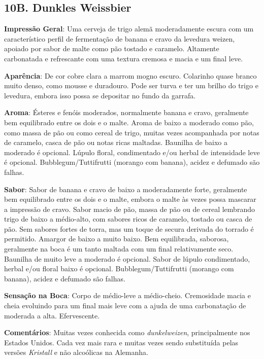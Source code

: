 \subsection*{10B. Dunkles Weissbier}

\textbf{Impressão Geral}: Uma cerveja de trigo alemã moderadamente escura com um característico perfil de fermentação de banana e cravo da levedura weizen, apoiado por sabor de malte como pão tostado e caramelo. Altamente carbonatada e refrescante com uma textura cremosa e macia e um final leve.

\textbf{Aparência}: De cor cobre clara a marrom mogno escuro. Colarinho quase branco muito denso, como mousse e duradouro. Pode ser turva e ter um brilho do trigo e levedura, embora isso possa se depositar no fundo da garrafa.

\textbf{Aroma}: Ésteres e fenóis moderados, normalmente banana e cravo, geralmente bem equilibrado entre os dois e o malte. Aroma de baixo a moderado como pão, como massa de pão ou como cereal de trigo, muitas vezes acompanhada por notas de caramelo, casca de pão ou notas ricas maltadas. Baunilha de baixo a moderado é opcional. Lúpulo floral, condimentado e/ou herbal de intensidade leve é opcional. Bubblegum/Tuttifrutti (morango com banana), acidez e defumado são falhas.

\textbf{Sabor}: Sabor de banana e cravo de baixo a moderadamente forte, geralmente bem equilibrado entre os dois e o malte, embora o malte às vezes possa mascarar a impressão de cravo. Sabor macio de pão, massa de pão ou de cereal lembrando trigo de baixo a médio-alto, com sabores ricos de caramelo, tostado ou casca de pão. Sem sabores fortes de torra, mas um toque de secura derivada do torrado é permitido. Amargor de baixo a muito baixo. Bem equilibrada, saborosa, geralmente na boca é um tanto maltada com um final relativamente seco. Baunilha de muito leve a moderado é opcional. Sabor de lúpulo condimentado, herbal e/ou floral baixo é opcional. Bubblegum/Tuttifrutti (morango com banana), acidez e defumado são falhas.

\textbf{Sensação na Boca}: Corpo de médio-leve a médio-cheio. Cremosidade macia e cheia evoluindo para um final mais leve com a ajuda de uma carbonatação de moderada a alta. Efervescente.

\textbf{Comentários}: Muitas vezes conhecida como \textit{dunkelweizen}, principalmente nos Estados Unidos. Cada vez mais rara e muitas vezes sendo substituída pelas versões \textit{Kristall} e não alcoólicas na Alemanha.

